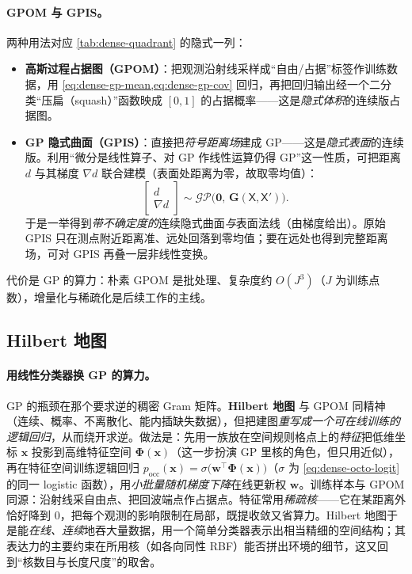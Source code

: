 \paragraph{GPOM 与 GPIS。}
两种用法对应 \cref{tab:dense-quadrant} 的隐式一列：
\begin{itemize}
  \item \textbf{高斯过程占据图（GPOM）}\cite{omeadhra2019gpom}：把观测沿射线采样成“自由/占据”标签作训练数据，用 \cref{eq:dense-gp-mean,eq:dense-gp-cov} 回归，再把回归输出经一个二分类“压扁（squash）”函数映成 $[0,1]$ 的占据概率——这是\emph{隐式体积}的连续版占据图。
  \item \textbf{GP 隐式曲面（GPIS）}\cite{williams2007gpis}：直接把\emph{符号距离场}建成 GP——这是\emph{隐式表面}的连续版。利用“微分是线性算子、对 GP 作线性运算仍得 GP”这一性质，可把距离 $d$ 与其梯度 $\nabla d$ 联合建模（表面处距离为零，故取零均值）：
\begin{equation}
  \begin{bmatrix} d \\ \nabla d \end{bmatrix}\sim\mathcal{GP}\!\bigl(\mathbf{0},\,\mathbf{G}(\mathsf{X},\mathsf{X}')\bigr).
  \label{eq:dense-gpis}
\end{equation}
于是一举得到\emph{带不确定度的}连续隐式曲面\emph{与}表面法线（由梯度给出）。原始 GPIS 只在测点附近距离准、远处回落到零均值；要在远处也得到完整距离场，可对 GPIS 再叠一层非线性变换。
\end{itemize}
代价是 GP 的算力：朴素 GPOM 是批处理、复杂度约 $O(J^3)$（$J$ 为训练点数），增量化与稀疏化是后续工作的主线。

\subsection{Hilbert 地图}
\label{sec:dense-implicit-hilbert}

\paragraph{用线性分类器换 GP 的算力。}
GP 的瓶颈在那个要求逆的稠密 Gram 矩阵。\textbf{Hilbert 地图}\cite{ramos2016hilbert} 与 GPOM 同精神（连续、概率、不离散化、能内插缺失数据），但把建图\emph{重写成一个可在线训练的逻辑回归}，从而绕开求逆。做法是：先用一族放在空间规则格点上的\emph{特征}把低维坐标 $\mathbf{x}$ 投影到高维特征空间 $\boldsymbol{\Phi}(\mathbf{x})$（这一步扮演 GP 里核的角色，但只用近似），再在特征空间训练逻辑回归 $p_{\mathrm{occ}}(\mathbf{x})=\sigma\!\bigl(\mathbf{w}^\top\boldsymbol{\Phi}(\mathbf{x})\bigr)$（$\sigma$ 为 \cref{eq:dense-octo-logit} 的同一 logistic 函数），用\emph{小批量随机梯度下降}在线更新权 $\mathbf{w}$。训练样本与 GPOM 同源：沿射线采自由点、把回波端点作占据点。特征常用\emph{稀疏核}——它在某距离外恰好降到 $0$，把每个观测的影响限制在局部，既提收敛又省算力。Hilbert 地图于是能\emph{在线、连续}地吞大量数据，用一个简单分类器表示出相当精细的空间结构；其表达力的主要约束在所用核（如各向同性 RBF）能否拼出环境的细节，这又回到“核数目与长度尺度”的取舍。

